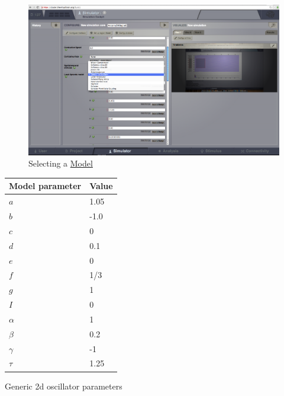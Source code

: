 \documentclass{tufte-handout}
\begin{document}
\begin{figure}[h]
  \includegraphics[width=\linewidth]{Handout_UI_BuildingYourOwnBrainNetworkModel_Model}%
  \caption{Selecting a \underline{Model}}%
  \label{fig:step_01}%
\end{figure}


\begin{margintable}
  \centering
  \selectfont
  \begin{tabular}{ll}
    \toprule
    Model parameter       & Value    \\
    \midrule
             $a$          &   1.05   \\
             $b$          &  -1.0    \\
             $c$          &   0      \\
             $d$          &   0.1    \\
             $e$          &   0      \\
             $f$          &   1/3    \\
             $g$          &   1      \\
             $I$          &   0      \\
             $\alpha$     &   1      \\
             $\beta$      &   0.2    \\
             $\gamma$     &  -1      \\
             $\tau$       &   1.25   \\
    \bottomrule
  \end{tabular}
  \caption{Generic 2d oscillator parameters}
  \label{tab:modeltab}
\end{margintable}



\end{document}

